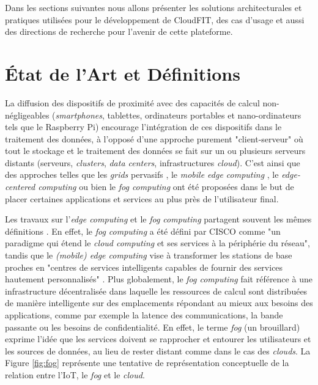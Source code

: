 Dans les sections suivantes nous allons présenter les solutions architecturales et pratiques utilisées pour le développement de CloudFIT, des cas d'usage et aussi des directions de recherche pour l'avenir de cette plateforme.

\section{État de l'Art et Définitions}

La diffusion des dispositifs de proximité avec des capacités de calcul non-négligeables (\textit{smartphones}, tablettes, ordinateurs portables et nano-ordinateurs tels que le Raspberry Pi) encourage l'intégration de ces dispositifs dans le traitement des données, à l'opposé d'une approche purement "client-serveur" où tout le stockage et le traitement des données se fait sur un ou plusieurs serveurs distants (serveurs, \textit{clusters}, \textit{data centers}, infrastructures \textit{cloud}). C'est ainsi que des approches telles que les \textit{grids} pervasifs \cite{Parashar2010}, le \textit{mobile edge computing} \cite {Dey2013,MEC,Satyanarayanan09}, le \textit{edge-centered computing} \cite{Lopez2015} ou bien le \textit{fog computing} \cite{Bonomi2012} ont été proposées dans le but de placer certaines applications et services au plus près de l'utilisateur final.

Les travaux sur l'\textit{edge computing} et le \textit{fog computing} partagent souvent les mêmes définitions \cite{Vermesan}. En effet, le \textit{fog computing} a été défini par CISCO \cite{FogCISCO} comme "un paradigme qui étend le \textit{cloud computing} et ses services à la périphérie du réseau", tandis que le \textit{(mobile) edge computing} vise à transformer les stations de base proches en "centres de services intelligents capables de fournir des services hautement personnalisés" \cite{Vermesan}. 
Plus globalement, le \textit{fog computing} fait référence à une infrastructure décentralisée dans laquelle les ressources de calcul sont distribuées de manière intelligente sur des emplacements répondant au mieux aux besoins des applications, comme par exemple la latence des communications, la bande passante ou les besoins de confidentialité. En effet, le terme \textit{fog} (un brouillard) exprime l'idée que les services doivent se rapprocher et entourer les utilisateurs et les sources de données, au lieu de rester distant comme dans le cas des \textit{clouds}. La Figure \ref{fig:fog} représente une tentative de représentation conceptuelle de la relation entre l'IoT, le \textit{fog} et le \textit{cloud}. 


